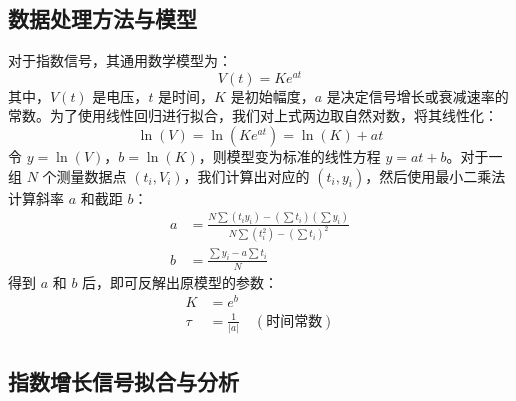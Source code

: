 \documentclass{ctexart}
\begin{document}
\subsection{数据处理方法与模型}
对于指数信号，其通用数学模型为：
\begin{equation}
    V(t) = K e^{at}
\end{equation}
其中，$V(t)$ 是电压，$t$ 是时间，$K$ 是初始幅度，$a$ 是决定信号增长或衰减速率的常数。为了使用线性回归进行拟合，我们对上式两边取自然对数，将其线性化：
\begin{equation}
    \ln(V) = \ln(K e^{at}) = \ln(K) + at
\end{equation}
令 $y = \ln(V)$，$b = \ln(K)$，则模型变为标准的线性方程 $y = at + b$。对于一组 $N$ 个测量数据点 $(t_i, V_i)$，我们计算出对应的 $(t_i, y_i)$，然后使用最小二乘法计算斜率 $a$ 和截距 $b$：
\begin{align}
    a &= \frac{N \sum(t_i y_i) - (\sum t_i)(\sum y_i)}{N \sum(t_i^2) - (\sum t_i)^2} \\
    b &= \frac{\sum y_i - a \sum t_i}{N}
\end{align}
得到 $a$ 和 $b$ 后，即可反解出原模型的参数：
\begin{align}
    K &= e^b \\
    \tau &= \frac{1}{|a|} \quad (\text{时间常数})
\end{align}

\subsection{指数增长信号拟合与分析}
\end{document}
